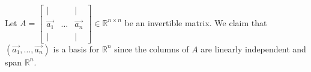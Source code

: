 \begin{eg}
    Let $A = \begin{bmatrix}
        | & & | \\
        \vec{a_1} & \ldots & \vec{a_n} \\
        | & & |
    \end{bmatrix} \in \mathbb{R}^{n \times n}$ be an invertible matrix. We claim that $(\vec{a_1}, \ldots, \vec{a_n})$ is a basis for $\mathbb{R}^n$ since the columns of $A$ are linearly independent and span $\mathbb{R}^n$.
\end{eg}